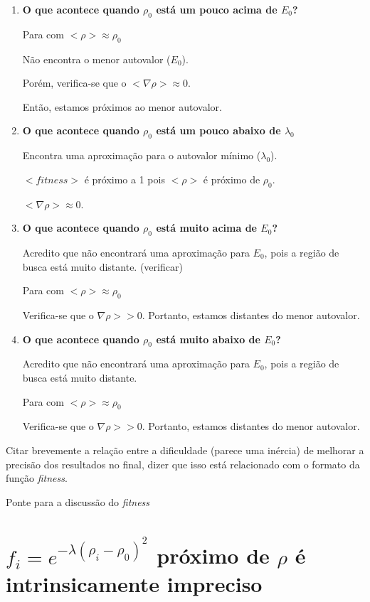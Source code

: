 	
	\begin{enumerate}
		\item \textbf{O que acontece quando $\rho_0$ está um pouco acima de $E_0$?}
		
				Para com $<\rho> \approx \rho_0$
				
				Não encontra o menor autovalor ($E_0$).
				
				Porém, verifica-se que o $<\nabla \rho> \approx 0$.
				
				Então, estamos próximos ao menor autovalor.

				
		\item \textbf{O que acontece quando $\rho_0$ está um pouco abaixo de $\lambda_0$}
						
				Encontra uma aproximação para o autovalor mínimo ($\lambda_0$).
				
				$<fitness>$ é próximo a 1 pois $<\rho>$ é próximo de $\rho_0$.
				
				$<\nabla \rho> \approx 0$.
				
						
		\item \textbf{O que acontece quando $\rho_0$ está muito acima de $E_0$?}
		
					Acredito que não encontrará uma aproximação para $E_0$, pois a região de busca está muito distante. (verificar)
					
				Para com $<\rho> \approx \rho_0$
				
				Verifica-se que o $\nabla \rho >> 0$. Portanto, estamos distantes do menor autovalor.
						
		\item \textbf{O que acontece quando $\rho_0$ está muito abaixo de $E_0$?}
				
				Acredito que não encontrará uma aproximação para $E_0$, pois a região de busca está muito distante.
				
				Para com $<\rho> \approx \rho_0$
				
				Verifica-se que o $\nabla \rho >> 0$. Portanto, estamos distantes do menor autovalor.
		
	\end{enumerate}
	
	Citar brevemente a relação entre a dificuldade (parece uma inércia) de melhorar a precisão dos resultados no final, dizer que isso está relacionado com o formato da função \textit{fitness}.
	
	Ponte para a discussão do \textit{fitness}
	
\section{$f_i = e^{-\lambda(\rho_i - \rho_0)^2}$ próximo de $\rho$ é intrinsicamente impreciso}
	
